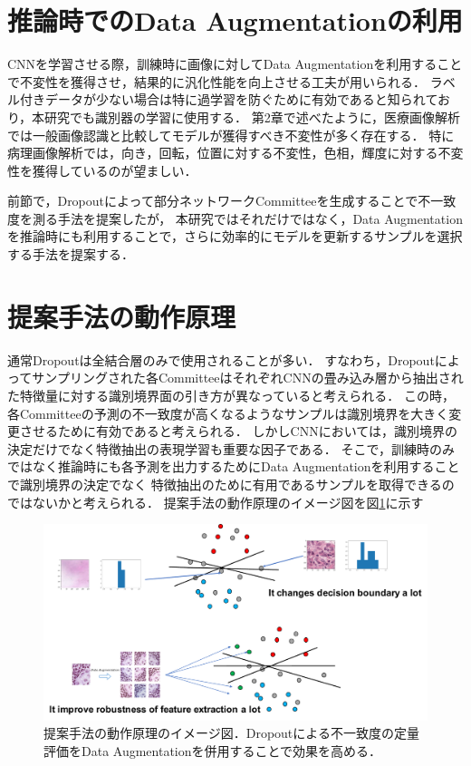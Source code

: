 \section{推論時でのData Augmentationの利用}
CNNを学習させる際，訓練時に画像に対してData Augmentationを利用することで不変性を獲得させ，結果的に汎化性能を向上させる工夫が用いられる．
ラベル付きデータが少ない場合は特に過学習を防ぐために有効であると知られており，本研究でも識別器の学習に使用する．
第2章で述べたように，医療画像解析では一般画像認識と比較してモデルが獲得すべき不変性が多く存在する．
特に病理画像解析では，向き，回転，位置に対する不変性，色相，輝度に対する不変性を獲得しているのが望ましい．

前節で，Dropoutによって部分ネットワークCommitteeを生成することで不一致度を測る手法を提案したが，
本研究ではそれだけではなく，Data Augmentationを推論時にも利用することで，さらに効率的にモデルを更新するサンプルを選択する手法を提案する．

\section{提案手法の動作原理}
通常Dropoutは全結合層のみで使用されることが多い．
すなわち，Dropoutによってサンプリングされた各CommitteeはそれぞれCNNの畳み込み層から抽出された特徴量に対する識別境界面の引き方が異なっていると考えられる．
この時，各Committeeの予測の不一致度が高くなるようなサンプルは識別境界を大きく変更させるために有効であると考えられる．
しかしCNNにおいては，識別境界の決定だけでなく特徴抽出の表現学習も重要な因子である．
そこで，訓練時のみではなく推論時にも各予測を出力するためにData Augmentationを利用することで識別境界の決定でなく
特徴抽出のために有用であるサンプルを取得できるのではないかと考えられる．
提案手法の動作原理のイメージ図を図\ref{fig:how_it_works}に示す


\begin{figure}[tbp]
     \begin{center}
      \includegraphics[width=120mm]{figures/how_it_works.pdf}
     \end{center}
    \caption{\label{fig:how_it_works}提案手法の動作原理のイメージ図．Dropoutによる不一致度の定量評価をData Augmentationを併用することで効果を高める．}
\end{figure}


